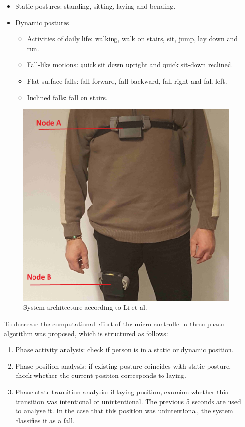 \documentclass[review]{elsarticle}
\begin{document}
\begin{itemize}
 \item Static postures: standing, sitting, laying and bending.
 \item Dynamic postures
 \begin{itemize}
  \item Activities of daily life: walking, walk on stairs, sit, jump, lay down and run.
  \item Fall-like motions: quick sit down upright and quick sit-down reclined.
  \item Flat surface falls: fall forward, fall backward, fall right and fall left.
  \item Inclined falls: fall on stairs.
 \end{itemize}
\end{itemize}

\begin{figure}[!ht]
  \centering
  \includegraphics[scale=0.15]{img/BasePrototype.png}
  \caption[System architecture]{System architecture according to Li et al.~\cite{Li2009}}
  \label{fig:simulation}
\end{figure}

To decrease the computational effort of the micro-controller a three-phase algorithm was proposed, which is structured 
as follows:

\begin{enumerate}
 \item Phase activity analysis: check if person is in a static or dynamic position.
 \item Phase position analysis: if existing posture coincides with static posture, check whether the current position corresponds to laying.
 \item Phase state transition analysis: if laying position, examine whether this transition was intentional or unintentional. The previous 5 
 seconds are used to analyse it. In the case that this position was unintentional, the system classifies it as a fall. 
\end{enumerate}
\end{document}
